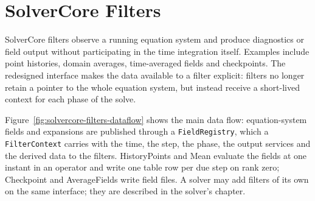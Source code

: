 \section{SolverCore Filters}
\label{sec:solvercore-filters}

SolverCore filters observe a running equation system and produce diagnostics or
field output without participating in the time integration itself. Examples
include point histories, domain averages, time-averaged fields and
checkpoints. The redesigned interface makes
the data available to a filter explicit: filters no longer retain a pointer to
the whole equation system, but instead receive a short-lived context for each
phase of the solve.

Figure~\ref{fig:solvercore-filters-dataflow} shows the main data flow:
equation-system fields and expansions are published through a
\texttt{FieldRegistry}, which a \texttt{FilterContext} carries with the time,
the step, the phase, the output services and the derived data to the filters.
HistoryPoints and Mean evaluate the fields at one instant in an operator and
write one table row per due step on rank zero; Checkpoint and AverageFields
write field files. A solver may add filters of its own on the same interface;
they are described in the solver's chapter.

